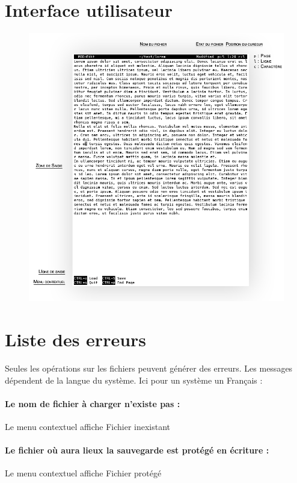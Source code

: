 \section{Interface utilisateur}
\begin{figure}[H]
\begin{center}
    \includegraphics[width=12cm]{img/MOD-Edit}
	\vspace{-1cm}
\end{center}
\end{figure}

\section{Liste des erreurs}
Seules les opérations sur les fichiers peuvent générer des erreurs. Les messages dépendent de la langue du système. Ici pour un système un Français :

\paragraph{Le nom de fichier à charger n'existe pas :} Le menu contextuel affiche \og Fichier inexistant\fg
\paragraph{Le fichier où aura lieux la sauvegarde est protégé en écriture :} Le menu contextuel affiche \og Fichier protégé\fg

